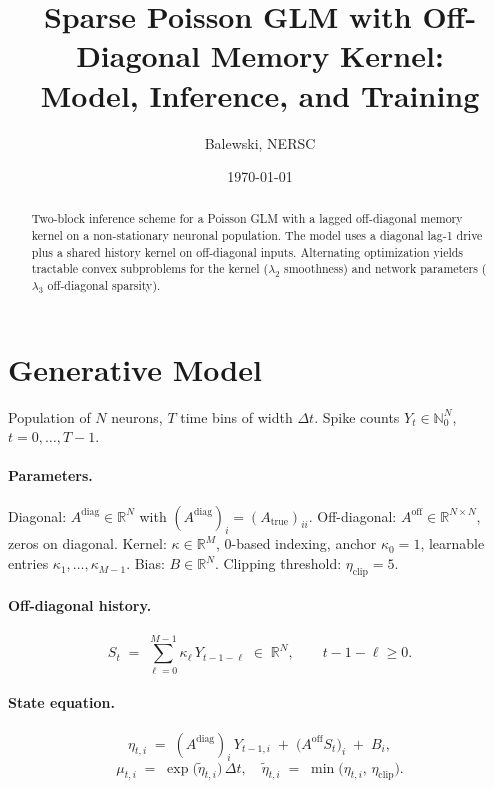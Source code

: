 \documentclass[11pt]{article}
\title{Sparse Poisson GLM with Off-Diagonal Memory Kernel:\\Model, Inference, and Training}
\author{Balewski, NERSC}
\date{\today}
\begin{document}
\maketitle

\begin{abstract}
Two-block inference scheme for a Poisson GLM with a lagged off-diagonal memory kernel on a non-stationary neuronal population. The model uses a diagonal lag-1 drive plus a shared history kernel on off-diagonal inputs. Alternating optimization yields tractable convex subproblems for the kernel (\(\lambda_2\) smoothness) and network parameters (\(\lambda_3\) off-diagonal sparsity).
\end{abstract}

\tableofcontents
\newpage

\section{Generative Model}
\label{sec:gen}

Population of \(N\) neurons, \(T\) time bins of width \(\Delta t\). Spike counts \(Y_t \in \mathbb{N}_0^{N}\), \(t=0,\dots,T-1\).

\paragraph{Parameters.}
Diagonal: \(A^{\mathrm{diag}} \in \mathbb{R}^{N}\) with \((A^{\mathrm{diag}})_i = (A_{\text{true}})_{ii}\).
Off-diagonal: \(A^{\mathrm{off}} \in \mathbb{R}^{N\times N}\), zeros on diagonal.
Kernel: \(\kappa \in \mathbb{R}^{M}\), 0-based indexing, anchor \(\kappa_0=1\), learnable entries \(\kappa_1,\dots,\kappa_{M-1}\).
Bias: \(B \in \mathbb{R}^{N}\).
Clipping threshold: \(\eta_{\mathrm{clip}}=5\).

\paragraph{Off-diagonal history.}
\[
S_t \;=\; \sum_{\ell=0}^{M-1} \kappa_\ell \, Y_{t-1-\ell} \;\in\; \mathbb{R}^{N},
\qquad t-1-\ell \ge 0.
\]

\paragraph{State equation.}
\[
\eta_{t,i} \;=\; (A^{\mathrm{diag}})_i \, Y_{t-1,i}
\;+\; \big(A^{\mathrm{off}} S_t\big)_i
\;+\; B_i,
\]
\[
\mu_{t,i} \;=\; \exp\!\big(\tilde{\eta}_{t,i}\big)\,\Delta t,\quad
\tilde{\eta}_{t,i} \;=\; \min\big(\eta_{t,i},\,\eta_{\mathrm{clip}}\big).
\]
\end{document}
